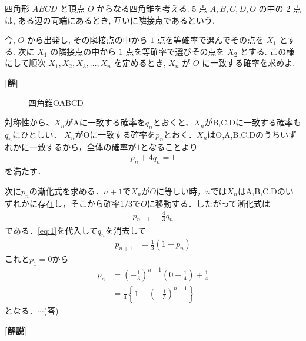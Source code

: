 \documentclass[a4paper,10pt]{ltjsarticle}
\begin{document}
\begin{oframed}
四角形 $ABCD$ と頂点 $O$ からなる四角錐を考える. $5$ 点 $A, B, C, D, O$ の中の $2$ 点は, ある辺の両端にあるとき, 互いに隣接点であるという.

今, $O$ から出発し, その隣接点の中から $1$ 点を等確率で選んでその点を $X_1$ とする. 次に $X_1$ の隣接点の中から $1$ 点を等確率で選びその点を $X_2$ とする. この様にして順次 $X_1, X_2, X_3, \dots, X_n$ を定めるとき, $X_n$ が $O$ に一致する確率を求めよ.
\end{oframed}
\setlength{\columnseprule}{0.4pt}
\begin{multicols}{2}
{\bf[解]}

\begin{figure}[H]
  \centering
{}
\caption{四角錐OABCD}
\end{figure}

 対称性から、$X_n$がAに一致する確率を$q_n$とおくと、$X_n$がB,C,Dに一致する確率も$q_n$にひとしい．
$X_n$がOに一致する確率を$p_n$とおく．$X_n$はO,A,B,C,Dのうちいずれかに一致するから，全体の確率が$1$となることより
\begin{align}
 p_n + 4q_n = 1 \label{eq:1}
\end{align}
を満たす．

次に$p_n$の漸化式を求める．$n+1$で$X_n$が$O$に等しい時，$n$では$X_n$はA,B,C,Dのいずれかに存在し，そこから確率$1/3$で$O$に移動する．したがって漸化式は
\begin{align*}
 p_{n+1} = \frac{4}{3}q_n
\end{align*}
である．\cref{eq:1}を代入して$q_n$を消去して
\begin{align}
  p_{n+1} &= \frac{1}{3}(1-p_n)
\end{align}
これと$p_1=0$から
\begin{align}
p_n 
&= \left(-\frac{1}{3}\right)^{n-1}\left(0-\frac{1}{4}\right)+\frac{1}{4} \\
&= \frac{1}{4}\left\{1-\left(-\frac{1}{3}\right)^{n-1}\right\}
\end{align}
となる．$\cdots$(答)

\vspace{10pt}
{\bf[解説]}


\newpage
\end{multicols}
\end{document}
